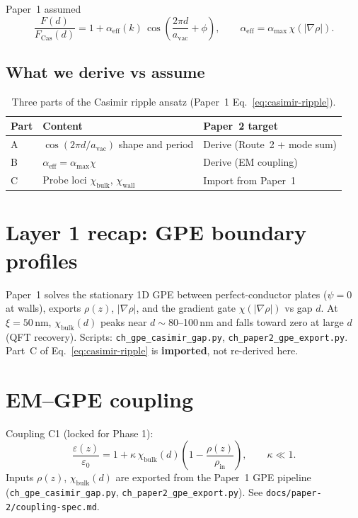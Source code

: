 \documentclass[11pt,a4paper]{article}
\begin{document}
Paper~1 assumed
\begin{equation}
  \frac{F(d)}{F_{\mathrm{Cas}}(d)} = 1 + \alpha_{\mathrm{eff}}(k)\,
  \cos\!\left(\frac{2\pi d}{a_{\mathrm{vac}}} + \phi\right),
  \qquad
  \alpha_{\mathrm{eff}} = \alpha_{\max}\,\chi(|\nabla\rho|).
  \label{eq:casimir-ripple}
\end{equation}

\subsection{What we derive vs assume}

\begin{table}[htbp]
  \centering
  \small
  \caption{Three parts of the Casimir ripple ansatz (Paper~1 Eq.~\ref{eq:casimir-ripple}).}
  \label{tab:three-parts}
  \begin{tabular}{@{}lll@{}}
    \toprule
    Part & Content & Paper~2 target \\
    \midrule
    A & $\cos(2\pi d/a_{\mathrm{vac}})$ shape and period & Derive (Route~2 + mode sum) \\
    B & $\alpha_{\mathrm{eff}} = \alpha_{\max}\chi$ & Derive (EM coupling) \\
    C & Probe loci $\chi_{\mathrm{bulk}}$, $\chi_{\mathrm{wall}}$ & Import from Paper~1 \\
    \bottomrule
  \end{tabular}
\end{table}

\section{Layer 1 recap: GPE boundary profiles}
\label{sec:layer1}

Paper~1 solves the stationary 1D GPE between perfect-conductor plates ($\psi = 0$ at walls),
exports $\rho(z)$, $|\nabla\rho|$, and the gradient gate $\chi(|\nabla\rho|)$ vs gap $d$.
At $\xi = 50$\,nm, $\chi_{\mathrm{bulk}}(d)$ peaks near $d \sim 80$--100\,nm and falls toward zero
at large $d$ (QFT recovery). Scripts: \texttt{ch\_gpe\_casimir\_gap.py},
\texttt{ch\_paper2\_gpe\_export.py}. Part~C of Eq.~\eqref{eq:casimir-ripple} is \textbf{imported}, not re-derived here.

\section{EM--GPE coupling}
\label{sec:coupling}

Coupling C1 (locked for Phase 1):
\begin{equation}
  \frac{\varepsilon(z)}{\varepsilon_0}
  = 1 + \kappa\,\chi_{\mathrm{bulk}}(d)\left(1 - \frac{\rho(z)}{\rho_{\mathrm{in}}}\right),
  \qquad \kappa \ll 1.
  \label{eq:coupling-c1}
\end{equation}
Inputs $\rho(z)$, $\chi_{\mathrm{bulk}}(d)$ are exported from the Paper~1 GPE pipeline
(\texttt{ch\_gpe\_casimir\_gap.py}, \texttt{ch\_paper2\_gpe\_export.py}).
See \texttt{docs/paper-2/coupling-spec.md}.
\end{document}
